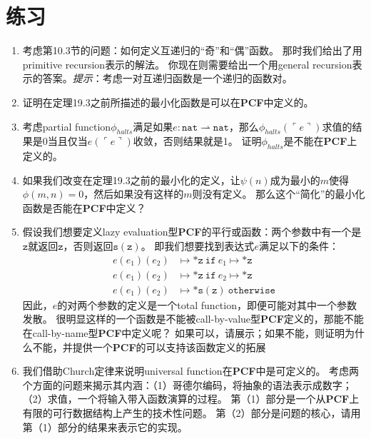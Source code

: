 \section*{练习}

\begin{enumerate}[label=\textbf{19.\arabic*.}]
	\item 考虑第10.3节的问题：如何定义互递归的“奇”和“偶”函数。
	那时我们给出了用\gls{primitive recursion}表示的解法。
	你现在则需要给出一个用\gls{general recursion}表示的答案。\textit{提示}：考虑一对互递归函数是一个递归的函数对。
	\item 
	证明在定理19.3之前所描述的最小化函数是可以在\textbf{PCF}中定义的。
	\item
	考虑\gls{partial function}\(\phi_{halts}\)满足如果\(e: \mathtt{nat} \rightharpoonup \mathtt{nat}\)，那么\(\phi_{halts}(\ulcorner e \urcorner)\)求值的结果是0当且仅当\(e(\ulcorner e \urcorner)\)收敛，否则结果就是1。
	证明\(\phi_{halts}\)是不能在\textbf{PCF}上定义的。
	\item 
	如果我们改变在定理19.3之前的最小化的定义，让\(\psi(n)\)成为最小的\(m\)使得\(\phi(m, n) = 0\)，然后如果没有这样的\(m\)则没有定义。
	那么这个“简化”的最小化函数是否能在\textbf{PCF}中定义？
	\item
	假设我们想要定义\gls{lazy evaluation}型\textbf{PCF}的平行或函数：两个参数中有一个是\(\mathtt{z}\)就返回\(\mathtt{z}\)，否则返回\(\mathtt{s}(\mathtt{z})\)。
	即我们想要找到表达式\(e\)满足以下的条件：
	\begin{align*}
		e(e_1)(e_2) & \longmapsto * \mathtt{z}\ \mathtt{if}\ e_1 \longmapsto * \mathtt{z} \\
		e(e_1)(e_2) & \longmapsto * \mathtt{z}\ \mathtt{if}\ e_2 \longmapsto * \mathtt{z} \\
		e(e_1)(e_2) & \longmapsto * \mathtt{s}(\mathtt{z})\ \mathtt{otherwise}
	\end{align*}
	因此，\(e\)的对两个参数的定义是一个\gls{total function}，即便可能对其中一个参数发散。
	很明显这样的一个函数是不能被\gls{call-by-value}型\textbf{PCF}定义的，那能不能在\gls{call-by-name}型\textbf{PCF}中定义呢？
	如果可以，请展示；如果不能，则证明为什么不能，并提供一个\textbf{PCF}的可以支持该函数定义的拓展
	\item
	我们借助Church定律来说明\gls{universal function}在\textbf{PCF}中是可定义的。
	考虑两个方面的问题来揭示其内涵：（1）哥德尔编码，将抽象的语法表示成数字；（2）求值，一个将输入带入函数演算的过程。
	第（1）部分是一个从\textbf{PCF}上有限的可行数据结构上产生的技术性问题。
	第（2）部分是问题的核心，请用第（1）部分的结果来表示它的实现。
\end{enumerate}